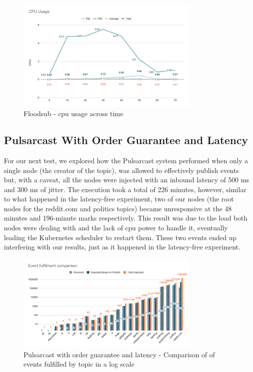 \begin{figure}[!htb]
  \centering
  \includegraphics[width=0.8\textwidth]{img/graph-floodsub-cpu.png}
  \caption{Floodsub - \acrshort{cpu} usage across time}
  \label{fig:graph-floodsub-cpu}
\end{figure}

\subsection{Pulsarcast With Order Guarantee and Latency}\label{subsec:pulsarcast-with-order-guarantee-and-latency}

For our next test, we explored how the Pulsarcast system performed when only a
single node (the creator of the topic), was allowed to effectively publish
events but, with a caveat, all the nodes were injected with an inbound latency
of 500 ms and 300 ms of jitter. The execution took a total of 226 minutes,
however, similar to what happened in the latency-free experiment, two of our
nodes (the root nodes for the reddit.com and politics topics) became
unresponsive at the 48 minutes and 196-minute marks respectively. This result
was due to the load both nodes were dealing with and the lack of \acrshort{cpu} power to
handle it, eventually leading the Kubernetes scheduler to restart them. These
two events ended up interfering with our results, just as it happened in the
latency-free experiment.

\begin{figure}[!htb]
  \centering
  \includegraphics[width=0.8\textwidth]{img/graph-pulsarcast-order-latency-event-fulfillment-comparison.png}
  \caption{Pulsarcast with order guarantee and latency - Comparison of of events fulfilled by topic in a log scale}
  \label{fig:graph-pulsarcast-order-latency-event-fulfillment-comparison}
\end{figure}

